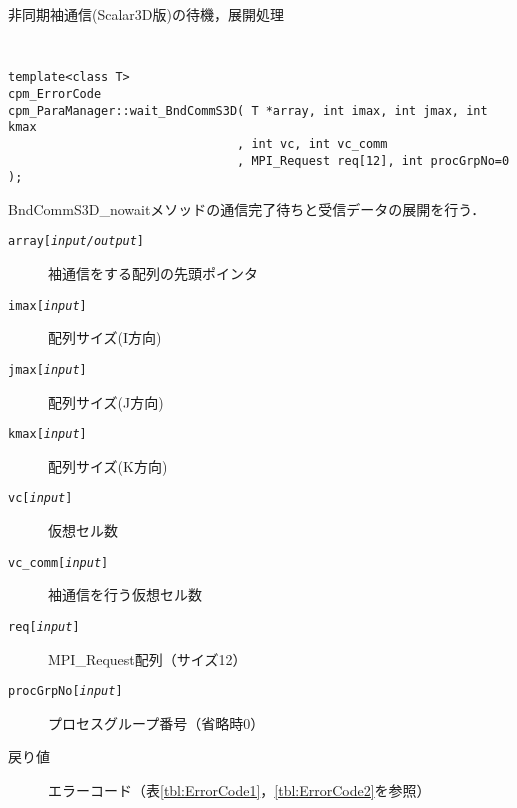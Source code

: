\begin{spacing}{0.8}
\begin{itembox}[l]{非同期袖通信(Scalar3D版)の待機，展開処理}
{\tt
\begin{verbatim}
template<class T>
cpm_ErrorCode
cpm_ParaManager::wait_BndCommS3D( T *array, int imax, int jmax, int kmax
                                , int vc, int vc_comm
                                , MPI_Request req[12], int procGrpNo=0 );
\end{verbatim}
}
BndCommS3D\_nowaitメソッドの通信完了待ちと受信データの展開を行う．
\begin{description}
\item[{\tt array[{\it input/output}]}] 袖通信をする配列の先頭ポインタ
\item[{\tt imax[{\it input}]}] 配列サイズ(I方向)
\item[{\tt jmax[{\it input}]}] 配列サイズ(J方向)
\item[{\tt kmax[{\it input}]}] 配列サイズ(K方向)
\item[{\tt vc[{\it input}]}] 仮想セル数
\item[{\tt vc\_comm[{\it input}]}] 袖通信を行う仮想セル数
\item[{\tt req[{\it input}]}] MPI\_Request配列（サイズ12）
\item[{\tt procGrpNo[{\it input}]}] プロセスグループ番号（省略時0）
\\
\item[戻り値] エラーコード（表\ref{tbl:ErrorCode1}，\ref{tbl:ErrorCode2}を参照）
\end{description}
\end{itembox}\\
\end{spacing}

